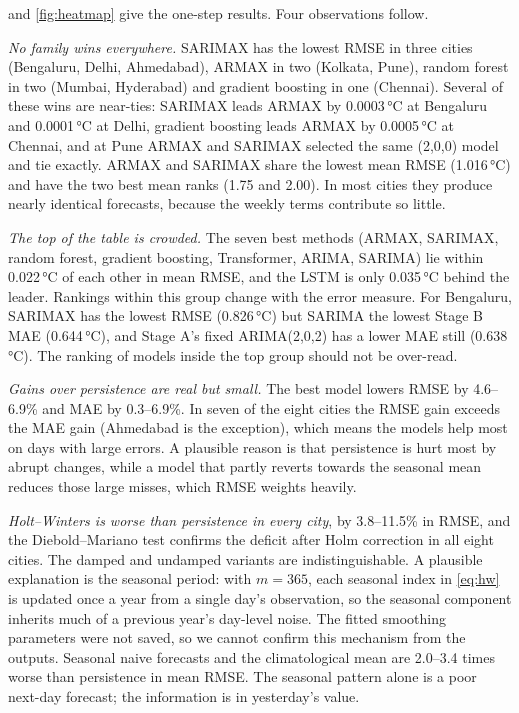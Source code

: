 \documentclass[11pt,a4paper]{article}
\newcommand{\degC}{\,\si{\degreeCelsius}}
\begin{document}
 and \cref{fig:heatmap} give the one-step results. Four observations follow.

\emph{No family wins everywhere.} SARIMAX has the lowest RMSE in three cities (Bengaluru, Delhi, Ahmedabad), ARMAX in two (Kolkata, Pune), random forest in two (Mumbai, Hyderabad) and gradient boosting in one (Chennai). Several of these wins are near-ties: SARIMAX leads ARMAX by 0.0003\degC{} at Bengaluru and 0.0001\degC{} at Delhi, gradient boosting leads ARMAX by 0.0005\degC{} at Chennai, and at Pune ARMAX and SARIMAX selected the same (2,0,0) model and tie exactly. ARMAX and SARIMAX share the lowest mean RMSE (1.016\degC) and have the two best mean ranks (1.75 and 2.00). In most cities they produce nearly identical forecasts, because the weekly terms contribute so little.

\emph{The top of the table is crowded.} The seven best methods (ARMAX, SARIMAX, random forest, gradient boosting, Transformer, ARIMA, SARIMA) lie within 0.022\degC{} of each other in mean RMSE, and the LSTM is only 0.035\degC{} behind the leader. Rankings within this group change with the error measure. For Bengaluru, SARIMAX has the lowest RMSE (0.826\degC) but SARIMA the lowest Stage B MAE (0.644\degC), and Stage A's fixed ARIMA(2,0,2) has a lower MAE still (0.638\degC). The ranking of models inside the top group should not be over-read.

\emph{Gains over persistence are real but small.} The best model lowers RMSE by 4.6--6.9\% and MAE by 0.3--6.9\%. In seven of the eight cities the RMSE gain exceeds the MAE gain (Ahmedabad is the exception), which means the models help most on days with large errors. A plausible reason is that persistence is hurt most by abrupt changes, while a model that partly reverts towards the seasonal mean reduces those large misses, which RMSE weights heavily.

\emph{Holt--Winters is worse than persistence in every city}, by 3.8--11.5\% in RMSE, and the Diebold--Mariano test confirms the deficit after Holm correction in all eight cities. The damped and undamped variants are indistinguishable. A plausible explanation is the seasonal period: with $m = 365$, each seasonal index in \cref{eq:hw} is updated once a year from a single day's observation, so the seasonal component inherits much of a previous year's day-level noise. The fitted smoothing parameters were not saved, so we cannot confirm this mechanism from the outputs. Seasonal naive forecasts and the climatological mean are 2.0--3.4 times worse than persistence in mean RMSE. The seasonal pattern alone is a poor next-day forecast; the information is in yesterday's value.
\end{document}
